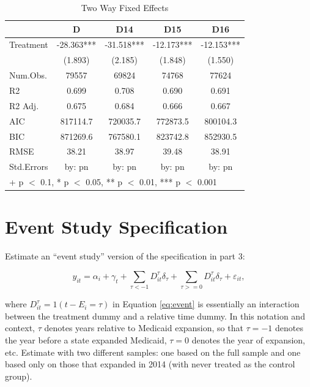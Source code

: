 \documentclass[
  12pt,
]{article}
\begin{document}
\begin{table}

\caption{\label{tab:Tab-2}Two Way Fixed Effects}
\centering
\begin{tabular}[t]{lcccc}
\toprule
  & D & D14 & D15 & D16\\
\midrule
Treatment & -28.363*** & -31.518*** & -12.173*** & -12.153***\\
 & (1.893) & (2.185) & (1.848) & (1.550)\\
\midrule
Num.Obs. & 79557 & 69824 & 74768 & 77624\\
R2 & 0.699 & 0.708 & 0.690 & 0.691\\
R2 Adj. & 0.675 & 0.684 & 0.666 & 0.667\\
AIC & 817114.7 & 720035.7 & 772873.5 & 800104.3\\
BIC & 871269.6 & 767580.1 & 823742.8 & 852930.5\\
RMSE & 38.21 & 38.97 & 39.48 & 38.91\\
Std.Errors & by: pn & by: pn & by: pn & by: pn\\
\bottomrule
\multicolumn{5}{l}{\rule{0pt}{1em}+ p $<$ 0.1, * p $<$ 0.05, ** p $<$ 0.01, *** p $<$ 0.001}\\
\end{tabular}
\end{table}

\hypertarget{event-study-specification}{%
\section{Event Study Specification}\label{event-study-specification}}

Estimate an ``event study'' version of the specification in part 3:

\begin{equation}\label{eq:event}
y_{it} = \alpha_{i} + \gamma_{t} +\sum_{\tau < -1} D_{it}^{\tau} \delta_{\tau} + \sum_{\tau>=0} D_{it}^{\tau} \delta_{\tau} + \varepsilon_{it},
\end{equation}

where \(D_{it}^{\tau} = 1(t-E_{i}=\tau)\) in Equation \ref{eq:event} is
essentially an interaction between the treatment dummy and a relative
time dummy. In this notation and context, \(\tau\) denotes years
relative to Medicaid expansion, so that \(\tau=-1\) denotes the year
before a state expanded Medicaid, \(\tau=0\) denotes the year of
expansion, etc. Estimate with two different samples: one based on the
full sample and one based only on those that expanded in 2014 (with
never treated as the control group).
\end{document}
